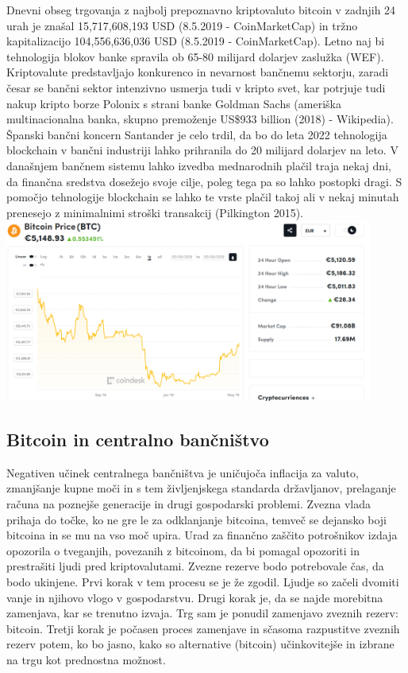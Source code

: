 \documentclass[letterpaper, titlepage, freqn]{article}
\begin{document}
Dnevni obseg trgovanja z najbolj prepoznavno kriptovaluto bitcoin v zadnjih 24 urah je znašal 15,717,608,193 USD (8.5.2019 - CoinMarketCap) in tržno kapitalizacijo 104,556,636,036 USD (8.5.2019 - CoinMarketCap).
Letno naj bi tehnologija blokov banke spravila ob 65-80 milijard dolarjev zaslužka (WEF).
Kriptovalute predstavljajo konkurenco in nevarnost bančnemu sektorju, zaradi česar se bančni sektor intenzivno usmerja tudi v kripto svet, kar potrjuje tudi nakup kripto borze Polonix s strani banke Goldman Sachs (ameriška multinacionalna banka, skupno premoženje US\$933 billion (2018) - Wikipedia).
Španski bančni koncern Santander je celo trdil, da bo do leta 2022 tehnologija blockchain v bančni industriji lahko prihranila do 20 milijard dolarjev na leto.
V današnjem bančnem sistemu lahko izvedba mednarodnih plačil traja nekaj dni, da finančna sredstva dosežejo svoje cilje, poleg tega pa so lahko postopki dragi. S pomočjo tehnologije blockchain se lahko te vrste plačil takoj ali v nekaj minutah prenesejo z minimalnimi stroški transakcij (Pilkington 2015). \\

\includegraphics[height=6cm]{stat}\\

\subsection{Bitcoin in centralno bančništvo}

Negativen učinek centralnega bančništva je uničujoča inflacija za valuto, zmanjšanje kupne moči in s tem življenjskega standarda državljanov, prelaganje računa na poznejše generacije in drugi gospodarski problemi.
Zvezna vlada prihaja do točke, ko ne gre le za odklanjanje bitcoina, temveč se dejansko boji bitcoina in se mu na vso moč upira. Urad za finančno zaščito potrošnikov izdaja opozorila o tveganjih, povezanih z bitcoinom, da bi pomagal opozoriti in prestrašiti ljudi pred kriptovalutami.
Zvezne rezerve bodo potrebovale čas, da bodo ukinjene. Prvi korak v tem procesu se je že zgodil. Ljudje so začeli dvomiti vanje in njihovo vlogo v gospodarstvu. Drugi korak je, da se najde morebitna zamenjava, kar se trenutno izvaja. Trg sam je ponudil zamenjavo zveznih rezerv: bitcoin. Tretji korak je počasen proces zamenjave in sčasoma razpustitve zveznih rezerv potem, ko bo jasno, kako so alternative (bitcoin) učinkovitejše in izbrane na trgu kot prednostna možnost.\\
\end{document}
